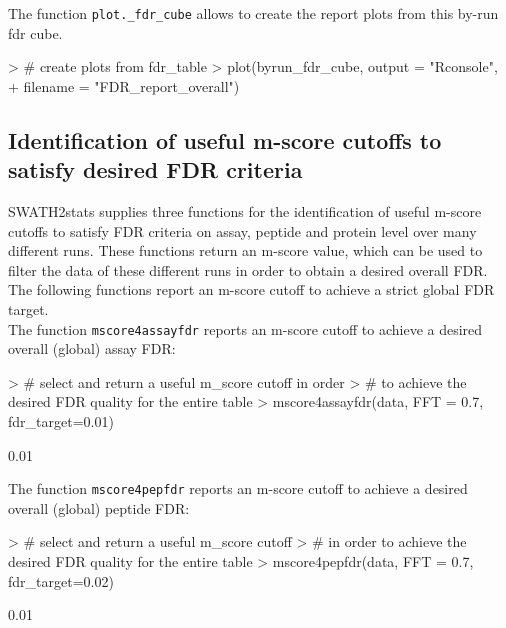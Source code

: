 \documentclass[a4paper]{article}
\begin{document}
The function \texttt{plot.\_fdr\_cube} allows to create the report plots from this by-run fdr cube.

\begin{Schunk}
\begin{Sinput}
> # create plots from fdr_table
> plot(byrun_fdr_cube, output = "Rconsole",
+               filename = "FDR_report_overall")
\end{Sinput}
\end{Schunk}

\subsection{Identification of useful m-score cutoffs to satisfy desired FDR criteria}

SWATH2stats supplies three functions for the identification of useful m-score cutoffs to satisfy FDR criteria on assay, peptide and protein level over many different runs. These functions return an m-score value, which can be used to filter the data of these different runs in order to obtain a desired overall FDR. The following functions report an m-score cutoff to achieve a strict global FDR target.\\
The function \texttt{mscore4assayfdr} reports an m-score cutoff to achieve a desired overall (global) assay FDR:

\begin{Schunk}
\begin{Sinput}
> # select and return a useful m_score cutoff in order
> # to achieve the desired FDR quality for the entire table
> mscore4assayfdr(data, FFT = 0.7, fdr_target=0.01)
\end{Sinput}
\begin{Soutput}
[1] 0.01
\end{Soutput}
\end{Schunk}

The function \texttt{mscore4pepfdr} reports an m-score cutoff to achieve a desired overall (global) peptide FDR:

\begin{Schunk}
\begin{Sinput}
> # select and return a useful m_score cutoff
> # in order to achieve the desired FDR quality for the entire table
> mscore4pepfdr(data, FFT = 0.7, fdr_target=0.02)
\end{Sinput}
\begin{Soutput}
[1] 0.01
\end{Soutput}
\end{Schunk}
\end{document}
